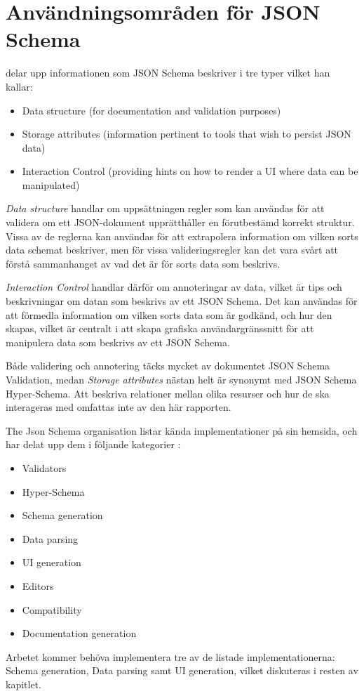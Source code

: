 \section{Användningsområden för JSON Schema}
\label{sec:teori:schema-användningsområden}
\citeauthor{Hilaiel} delar upp informationen som JSON Schema beskriver i tre typer \cite{Hilaiel} vilket han kallar:
\begin{itemize}
	\item Data structure (for documentation and validation purposes)
	\item Storage attributes (information pertinent to tools that wish to persist JSON data)
	\item Interaction Control (providing hints on how to render a UI where data can be manipulated)
\end{itemize}

\textit{Data structure} handlar om uppsättningen regler som kan användas för att validera om ett JSON-dokument upprätthåller en förutbestämd korrekt struktur. Vissa av de reglerna kan användas för att extrapolera information om vilken sorts data schemat beskriver, men för vissa valideringsregler kan det vara svårt att förstå sammanhanget av vad det är för sorts data som beskrivs.

\textit{Interaction Control} handlar därför om annoteringar av data, vilket är tips och beskrivningar om datan som beskrivs av ett JSON Schema. Det kan användas för att förmedla information om vilken sorts data som är godkänd, och hur den skapas, vilket är centralt i att skapa grafiska användargränssnitt för att manipulera data som beskrivs av ett JSON Schema.

Både validering och annotering täcks mycket av dokumentet JSON Schema Validation, medan \textit{Storage attributes} nästan helt är synonymt med JSON Schema Hyper-Schema. Att beskriva relationer mellan olika resurser och hur de ska interageras med omfattas inte av den här rapporten.

The Json Schema organisation listar kända implementationer på sin hemsida, och har delat upp dem i följande kategorier \cite{TheJSONSchemaorganisation}:
\begin{itemize}
	\item Validators
	\item Hyper-Schema
	\item Schema generation
	\item Data parsing
	\item UI generation
	\item Editors
	\item Compatibility
	\item Documentation generation
\end{itemize}
\noindent
Arbetet kommer behöva implementera tre av de listade implementationerna: Schema generation, Data parsing samt UI generation, vilket diskuteras i resten av kapitlet.

